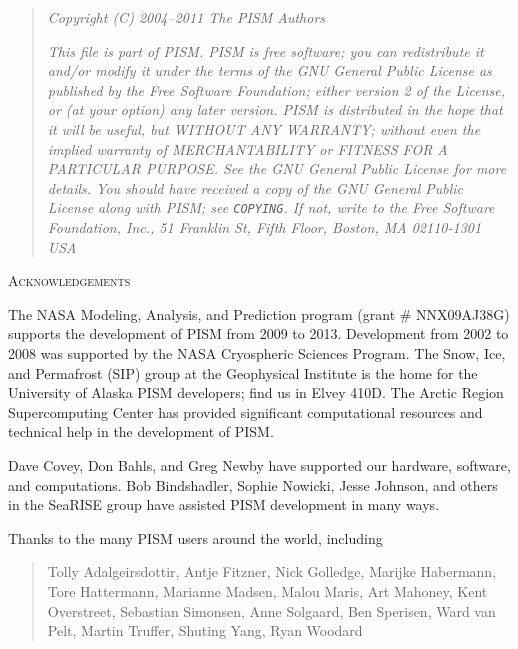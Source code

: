 \documentclass[titlepage,letterpaper,final]{scrartcl}
\begin{document}
\newpage
\vspace{0.2in}
\begin{quote}
\textsl{Copyright (C) 2004--2011 The PISM Authors}
\medskip

\noindent \textsl{This file is part of PISM.  PISM is free software; you can redistribute it and/or modify it under the terms of the GNU General Public License as published by the Free Software Foundation; either version 2 of the License, or (at your option) any later version.  PISM is distributed in the hope that it will be useful, but WITHOUT ANY WARRANTY; without even the implied warranty of MERCHANTABILITY or FITNESS FOR A PARTICULAR PURPOSE.  See the GNU General Public License for more details.  You should have received a copy of the GNU General Public License along with PISM; see \emph{\texttt{COPYING}}.  If not, write to the Free Software Foundation, Inc., 51 Franklin St, Fifth Floor, Boston, MA  02110-1301 USA}
\end{quote}
\vspace{0.5in}

\centerline{\textsc{Acknowledgements}}
\bigskip

\small
The NASA Modeling, Analysis, and Prediction program (grant \# NNX09AJ38G) supports the development of PISM from 2009 to 2013.  Development from 2002 to 2008 was supported by the NASA Cryospheric Sciences Program.  The Snow, Ice, and Permafrost (SIP) group at the Geophysical Institute is the home for the University of Alaska PISM developers; find us in Elvey 410D.  The Arctic Region Supercomputing Center has provided significant computational resources and technical help in the development of PISM.

Dave Covey, Don Bahls, and Greg Newby have supported our hardware, software, and computations.  Bob Bindshadler, Sophie Nowicki, Jesse Johnson, and others in the SeaRISE group have assisted PISM development in many ways.  

Thanks to the many PISM users around the world, including

\begin{quote}
Tolly Adalgeirsdottir, Antje Fitzner, Nick Golledge, Marijke Habermann, Tore Hattermann, Marianne Madsen, Malou Maris, Art Mahoney, Kent Overstreet, Sebastian Simonsen, Anne Solgaard, Ben Sperisen, Ward van Pelt, Martin Truffer, Shuting Yang, Ryan Woodard
\end{quote}
\end{document}
